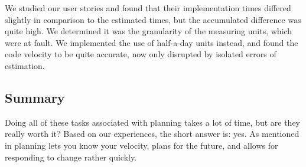 We studied our user stories and found that their implementation times differed slightly in comparison to the estimated times, but the accumulated difference was quite high.
We determined it was the granularity of the measuring units, which were at fault.
We implemented the use of half-a-day units instead, and found the code velocity to be quite accurate, now only disrupted by isolated errors of estimation.

\subsection{Summary}
Doing all of these tasks associated with planning takes a lot of time, but are they really worth it?
Based on our experiences, the short answer is: yes.
As mentioned in  planning lets you know your velocity, plans for the future, and allows for responding to change rather quickly.


